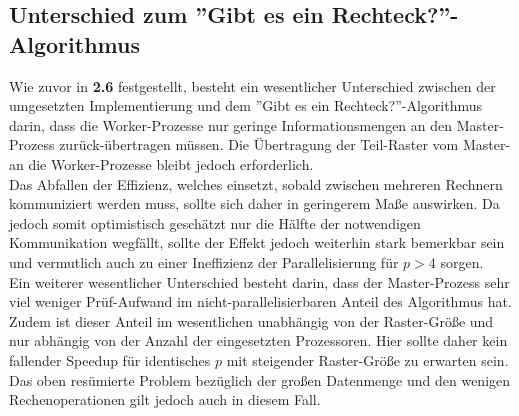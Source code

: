\documentclass[
10pt, %
a4paper, %
oneside, %
headinclude,footinclude, %
BCOR5mm, %
]{scrartcl}
\begin{document}
\subsection{Unterschied zum ''Gibt es ein Rechteck?''-Algorithmus}
Wie zuvor in \textbf{2.6} festgestellt, besteht ein wesentlicher Unterschied zwischen der umgesetzten Implementierung und dem ''Gibt es ein Rechteck?''-Algorithmus darin, dass die Worker-Prozesse nur geringe Informationsmengen an den Master-Prozess zurück-übertragen müssen. Die Übertragung der Teil-Raster vom Master- an die Worker-Prozesse bleibt jedoch erforderlich.\\
Das Abfallen der Effizienz, welches einsetzt, sobald zwischen mehreren Rechnern kommuniziert werden muss, sollte sich daher in geringerem Maße auswirken. Da jedoch somit optimistisch geschätzt nur die Hälfte der notwendigen Kommunikation wegfällt, sollte der Effekt jedoch weiterhin stark bemerkbar sein und vermutlich auch zu einer Ineffizienz der Parallelisierung für \(p>4\) sorgen.\\

Ein weiterer wesentlicher Unterschied besteht darin, dass der Master-Prozess sehr viel weniger Prüf-Aufwand im nicht-parallelisierbaren Anteil des Algorithmus hat. Zudem ist dieser Anteil im wesentlichen unabhängig von der Raster-Größe und nur abhängig von der Anzahl der eingesetzten Prozessoren. Hier sollte daher kein fallender Speedup für identisches \(p\) mit steigender Raster-Größe zu erwarten sein.\\

Das oben resümierte Problem bezüglich der großen Datenmenge und den wenigen Rechenoperationen gilt jedoch auch in diesem Fall.
\end{document}
